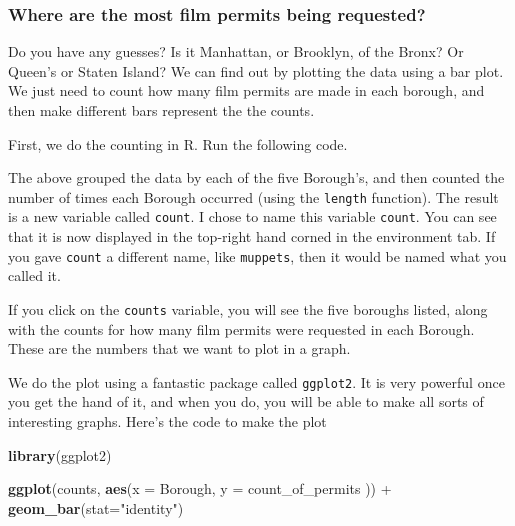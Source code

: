 \documentclass[]{book}
\newenvironment{Shaded}{\begin{snugshade}}{\end{snugshade}}
\newcommand{\KeywordTok}[1]{\textcolor[rgb]{0.13,0.29,0.53}{\textbf{{#1}}}}
\newcommand{\DataTypeTok}[1]{\textcolor[rgb]{0.13,0.29,0.53}{{#1}}}
\newcommand{\StringTok}[1]{\textcolor[rgb]{0.31,0.60,0.02}{{#1}}}
\newcommand{\NormalTok}[1]{{#1}}
\theoremstyle{definition}
\theoremstyle{definition}
\theoremstyle{definition}
\theoremstyle{remark}
\begin{document}
\subsubsection{Where are the most film permits being
requested?}\label{where-are-the-most-film-permits-being-requested}

Do you have any guesses? Is it Manhattan, or Brooklyn, of the Bronx? Or
Queen's or Staten Island? We can find out by plotting the data using a
bar plot. We just need to count how many film permits are made in each
borough, and then make different bars represent the the counts.

First, we do the counting in R. Run the following code.

\begin{Shaded}
\end{Shaded}

The above grouped the data by each of the five Borough's, and then
counted the number of times each Borough occurred (using the
\texttt{length} function). The result is a new variable called
\texttt{count}. I chose to name this variable \texttt{count}. You can
see that it is now displayed in the top-right hand corned in the
environment tab. If you gave \texttt{count} a different name, like
\texttt{muppets}, then it would be named what you called it.

If you click on the \texttt{counts} variable, you will see the five
boroughs listed, along with the counts for how many film permits were
requested in each Borough. These are the numbers that we want to plot in
a graph.

We do the plot using a fantastic package called \texttt{ggplot2}. It is
very powerful once you get the hand of it, and when you do, you will be
able to make all sorts of interesting graphs. Here's the code to make
the plot

\begin{Shaded}
\begin{Highlighting}[]
\KeywordTok{library}\NormalTok{(ggplot2)}

\KeywordTok{ggplot}\NormalTok{(counts, }\KeywordTok{aes}\NormalTok{(}\DataTypeTok{x =} \NormalTok{Borough, }\DataTypeTok{y =} \NormalTok{count_of_permits )) +}
\StringTok{  }\KeywordTok{geom_bar}\NormalTok{(}\DataTypeTok{stat=}\StringTok{"identity"}\NormalTok{)}
\end{Highlighting}
\end{Shaded}
\end{document}
